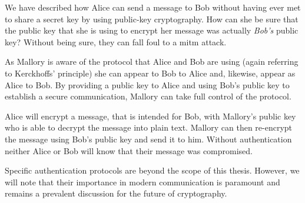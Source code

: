 We have described how Alice can send a message to Bob without having ever met to share a secret key by using public-key cryptography. How can she be sure that the public key that she is using to encrypt her message was actually \emph{Bob's} public key? Without being sure, they can fall foul to a \ac{mitm} attack.

As Mallory is aware of the protocol that Alice and Bob are using (again referring to Kerckhoffs' principle) she can appear to Bob to Alice and, likewise, appear as Alice to Bob. By providing a public key to Alice and using Bob's public key to establish a secure communication, Mallory can take full control of the protocol. 

Alice will encrypt a message, that is intended for Bob, with Mallory's public key who is able to decrypt the message into plain text. Mallory can then re-encrypt the message using Bob's public key and send it to him. Without authentication neither Alice or Bob will know that their message was compromised. 

Specific authentication protocols are beyond the scope of this thesis. However, we will note that their importance in modern communication is paramount and remains a prevalent discussion for the future of cryptography. 






